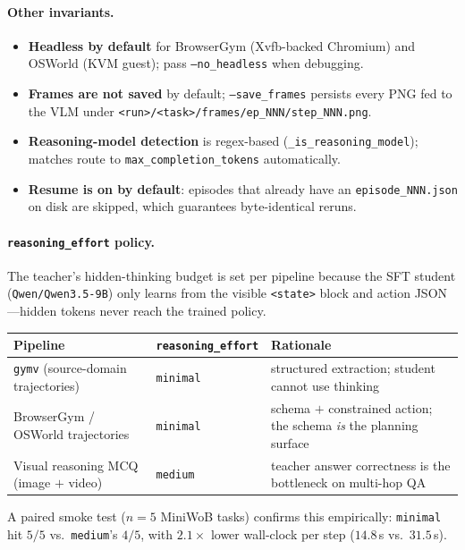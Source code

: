 \paragraph{Other invariants.}
\begin{itemize}
  \item \textbf{Headless by default} for BrowserGym (Xvfb-backed
        Chromium) and OSWorld (KVM guest); pass \texttt{--no\_headless}
        when debugging.
  \item \textbf{Frames are not saved} by default; \texttt{--save\_frames}
        persists every PNG fed to the VLM under
        \texttt{<run>/<task>/frames/ep\_NNN/step\_NNN.png}.
  \item \textbf{Reasoning-model detection} is regex-based
        (\texttt{\_is\_reasoning\_model}); matches route to
        \texttt{max\_completion\_tokens} automatically.
  \item \textbf{Resume is on by default}: episodes that already have an
        \texttt{episode\_NNN.json} on disk are skipped, which
        guarantees byte-identical reruns.
\end{itemize}

\paragraph{\texttt{reasoning\_effort} policy.}
The teacher's hidden-thinking budget is set per pipeline because the
SFT student (\texttt{Qwen/Qwen3.5-9B}) only learns from the visible
\texttt{<state>} block and action JSON---hidden tokens never reach the
trained policy.
\begin{center}
\small
\begin{tabular}{@{}lll@{}}
\toprule
\textbf{Pipeline} & \texttt{reasoning\_effort} & \textbf{Rationale} \\
\midrule
\texttt{gymv} (source-domain trajectories) & \texttt{minimal} & structured extraction; student cannot use thinking \\
BrowserGym / OSWorld trajectories          & \texttt{minimal} & schema $+$ constrained action; the schema \emph{is} the planning surface \\
Visual reasoning MCQ (image $+$ video)     & \texttt{medium}  & teacher answer correctness is the bottleneck on multi-hop QA \\
\bottomrule
\end{tabular}
\end{center}
A paired smoke test ($n=5$ MiniWoB tasks) confirms this empirically:
\texttt{minimal} hit $5/5$ vs.\ \texttt{medium}'s $4/5$, with
$2.1\times$ lower wall-clock per step ($14.8$\,s vs.\ $31.5$\,s).

